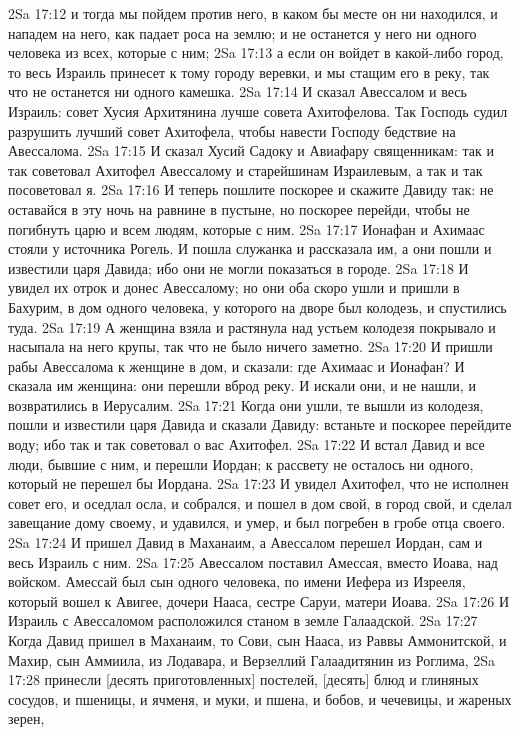 \vs 2Sa 17:12 и тогда мы пойдем против него, в каком бы месте он ни находился, и нападем на него, как падает роса на землю; и не останется у него ни одного человека из всех, которые с ним;
\vs 2Sa 17:13 а если он войдет в какой-либо город, то весь Израиль принесет к тому городу веревки, и мы стащим его в реку, так что не останется ни одного камешка.
\vs 2Sa 17:14 И сказал Авессалом и весь Израиль: совет Хусия Архитянина лучше совета Ахитофелова. Так Господь судил разрушить лучший совет Ахитофела, чтобы навести Господу бедствие на Авессалома.
\vs 2Sa 17:15 И сказал Хусий Садоку и Авиафару священникам: так и так советовал Ахитофел Авессалому и старейшинам Израилевым, а так и так посоветовал я.
\vs 2Sa 17:16 И теперь пошлите поскорее и скажите Давиду так: не оставайся в эту ночь на равнине в пустыне, но поскорее перейди, чтобы не погибнуть царю и всем людям, которые с ним.
\vs 2Sa 17:17 Ионафан и Ахимаас стояли у источника Рогель. И пошла служанка и рассказала им, а они пошли и известили царя Давида; ибо они не могли показаться в городе.
\vs 2Sa 17:18 И увидел их отрок и донес Авессалому; но они оба скоро ушли и пришли в Бахурим, в дом одного человека, у которого на дворе был колодезь, и спустились туда.
\vs 2Sa 17:19 А женщина взяла и растянула над устьем колодезя покрывало и насыпала на него крупы, так что не было ничего заметно.
\vs 2Sa 17:20 И пришли рабы Авессалома к женщине в дом, и сказали: где Ахимаас и Ионафан? И сказала им женщина: они перешли вброд реку. И искали они, и не нашли, и возвратились в Иерусалим.
\vs 2Sa 17:21 Когда они ушли, те вышли из колодезя, пошли и известили царя Давида и сказали Давиду: встаньте и поскорее перейдите воду; ибо так и так советовал о вас Ахитофел.
\vs 2Sa 17:22 И встал Давид и все люди, бывшие с ним, и перешли Иордан; к рассвету не осталось ни одного, который не перешел бы Иордана.
\vs 2Sa 17:23 И увидел Ахитофел, что не исполнен совет его, и оседлал осла, и собрался, и пошел в дом свой, в город свой, и сделал завещание дому своему, и удавился, и умер, и был погребен в гробе отца своего.
\vs 2Sa 17:24 И пришел Давид в Маханаим, а Авессалом перешел Иордан, сам и весь Израиль с ним.
\vs 2Sa 17:25 Авессалом поставил Амессая, вместо Иоава, над войском. Амессай был сын одного человека, по имени Иефера из Изрееля, который вошел к Авигее, дочери Нааса, сестре Саруи, матери Иоава.
\vs 2Sa 17:26 И Израиль с Авессаломом расположился станом в земле Галаадской.
\vs 2Sa 17:27 Когда Давид пришел в Маханаим, то Сови, сын Нааса, из Раввы Аммонитской, и Махир, сын Аммиила, из Лодавара, и Верзеллий Галаадитянин из Роглима,
\vs 2Sa 17:28 принесли [десять приготовленных] постелей, [десять] блюд и глиняных сосудов, и пшеницы, и ячменя, и муки, и пшена, и бобов, и чечевицы, и жареных зерен,
